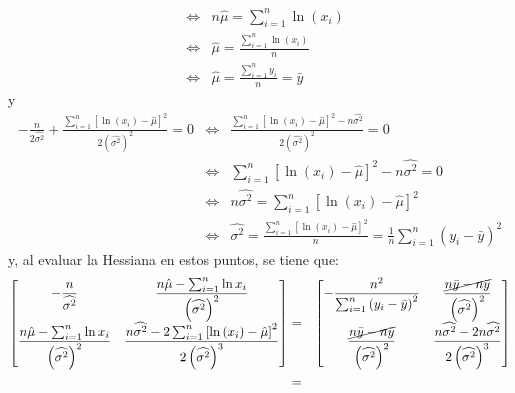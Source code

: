 \begin{solucion}
\begin{enumerate}
\begin{eqnarray*}
   & \Leftrightarrow & n\hat{\mu} = \sum_{i=1}^n \ln\left( x_i \right) \\
   & \Leftrightarrow & \hat{\mu} = \frac{\sum_{i=1}^n \ln\left( x_i \right)}{n} \\
   & \Leftrightarrow & \hat{\mu} = \frac{\sum_{i=1}^n y_i}{n} = \bar{y}
  \end{eqnarray*}
  y
  \begin{eqnarray*}
   - \frac{n}{2\widehat{\sigma^2}} + \frac{\sum_{i=1}^n \left[ \ln\left( x_i \right) - \hat{\mu} \right]^2}{2\left( \widehat{\sigma^2} \right)^2} = 0 & \Leftrightarrow & \frac{\sum_{i=1}^n \left[ \ln\left( x_i \right) - \hat{\mu} \right]^2 - n\widehat{\sigma^2}}{2\left( \widehat{\sigma^2} \right)^2} = 0 \\
   & \Leftrightarrow & \sum_{i=1}^n \left[ \ln\left( x_i \right) - \hat{\mu} \right]^2 - n\widehat{\sigma^2} = 0 \\
   & \Leftrightarrow & n\widehat{\sigma^2} = \sum_{i=1}^n \left[ \ln\left( x_i \right) - \hat{\mu} \right]^2 \\
   & \Leftrightarrow & \widehat{\sigma^2} = \frac{\sum_{i=1}^n \left[ \ln\left( x_i \right) - \hat{\mu} \right]^2}{n} = \frac{1}{n} \sum_{i=1}^n \left( y_i - \bar{y} \right)^2
  \end{eqnarray*}
  y, al evaluar la Hessiana en estos puntos, se tiene que:
  \begin{eqnarray*}
   \begin{bmatrix}
    \displaystyle{ - \frac{n}{\widehat{\sigma^2}} } & \displaystyle{ \frac{n\hat{\mu} - \sum_{i=1}^n \ln x_i}{\left( \widehat{ \sigma^2 } \right)^2} } \\
    \displaystyle{ \frac{n\hat{\mu} - \sum_{i=1}^n \ln x_i}{\left( \widehat{ \sigma^2 } \right)^2} } & \displaystyle{ \frac{n\widehat{ \sigma^2 } - 2\sum_{i=1}^n \left[ \ln\left( x_i \right) - \hat{\mu} \right]^2}{2\left( \widehat{ \sigma^2 } \right)^3} }
   \end{bmatrix}
   & = & 
   \begin{bmatrix}
    \displaystyle{ -\frac{n^2}{\sum_{i=1}^n \left( y_i - \bar{y} \right)^2 } } & \displaystyle{ \frac{ \cancel{n\bar{y} - n\bar{y}} }{\left( \widehat{\sigma^2} \right)^2} } \\
    \displaystyle{ \frac{ \cancel{n\bar{y} - n\bar{y}} }{\left( \widehat{\sigma^2} \right)^2} } & \displaystyle{ \frac{n\widehat{\sigma^2} - 2n\widehat{\sigma^2}}{2\left( \widehat{\sigma^2} \right)^3} }
   \end{bmatrix}
   \\
   & = &

\end{eqnarray*}
\end{enumerate}
\end{solucion}

